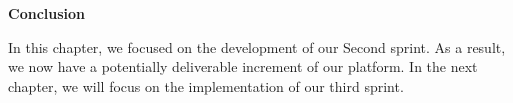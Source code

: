 \newpage
\begin{center}
    \doublespacing 
    \centering
    \LARGE\textbf{Conclusion} 
    \vspace{1cm} \\
    \raggedright
\end{center}
In this chapter, we focused on the development of our Second sprint. As a result, we now have a potentially deliverable increment of our platform.
In the next chapter, we will focus on the implementation of our third sprint.



